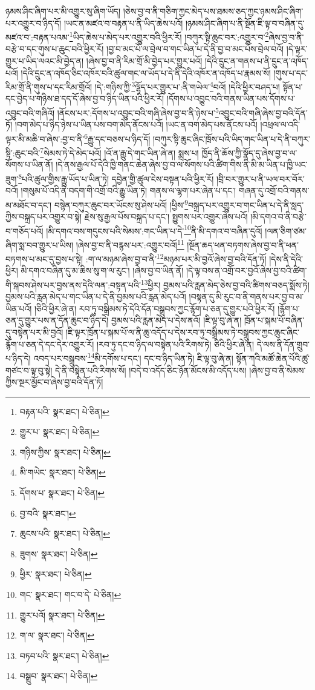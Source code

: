 ཉམས་ཤིང་ཞིག་པར་མི་འགྱུར་སུ་ཞིག་ཡོད། །ཅེས་བྱ་བ་ནི་གཅིག་ཀྱང་མེད་པས་ཐམས་ཅད་ཀྱང་ཉམས་ཤིང་ཞིག་པར་འགྱུར་བ་ཉིད་དོ། །ཡང་ན་མཛའ་བ་བརྟན་པ་ནི་ཡིད་ཆེས་པའོ། །ཉམས་ཤིང་ཞིག་པ་ནི་སྔོན་ཇི་ལྟ་བ་བཞིན་དུ་མཛའ་བ་:བརྟན་པའམ་\footnote{བརྟན་པའི་  སྣར་ཐང་།  པེ་ཅིན། }ཡིད་ཆེས་པ་མེད་པར་འགྱུར་བའི་ཕྱིར་རོ། །བཀུར་སྟི་ཆུང་བར་:འགྱུར་བ་\footnote{གྱུར་པ་  སྣར་ཐང་།  པེ་ཅིན། }ཞེས་བྱ་བ་ནི་བརྩེ་བ་དང་གུས་པ་ཆུང་བའི་ཕྱིར་རོ། །བྱ་བ་མང་པོ་ལ་བྲེལ་བ་གང་ཡིན་པ་དེ་ནི་བྱ་བ་མང་པོས་བྲེལ་བའོ། །དེ་ལྟར་གྱུར་པ་ཡིད་ལའང་མི་བྱེད་ན། །ཞེས་བྱ་བ་ནི་རིམ་གྲོ་མི་བྱེད་པར་གྱུར་པའོ། །དེའི་དྲུང་ན་གནས་པ་ནི་དྲུང་ན་འཁོད་པའོ། །དེའི་དྲུང་ན་འཁོད་ཅིང་འཁོར་བའི་ཚུལ་གང་ལ་ཡོད་པ་དེ་ནི་དེའི་འཁོར་ན་འཁོད་པ་རྣམས་སོ། །གུས་པ་དང་རིམ་གྲོ་ནི་གུས་པ་དང་རིམ་གྲོའོ། །དེ་:གཉིས་ཀྱི་\footnote{གཉིས་ཀྱིས་  སྣར་ཐང་།  པེ་ཅིན། }ལྷོད་པར་གྱུར་པ་:ནི་གཡེལ་\footnote{མི་གཡེང་  སྣར་ཐང་།  པེ་ཅིན། }བའོ། །དེའི་ཕྱིར་བཤད་པ། སྟོན་པ་དང་བྱེད་པ་གཉིས་ཐ་དད་དོ་ཞེས་བྱ་བ་ཉིད་ཡིན་པའི་ཕྱིར་རོ། །དོགས་པ་འབྱུང་བའི་གནས་ཡིན་པས་དོགས་པ་འབྱུང་བའི་གཞིའོ། །ནོངས་པར་:དོགས་པ་འབྱུང་བའི་གཞི་ཞེས་བྱ་བ་ནི་ཉེས་པ་\footnote{དོགས་པ་  སྣར་ཐང་།  པེ་ཅིན། }འབྱུང་བའི་གཞི་ཞེས་བྱ་བའི་དོན་ཏོ། །བག་མེད་པ་ཉིད་ཉེས་པ་ཡིན་པས་བག་མེད་ནོངས་པའོ། །ཡང་ན་བག་མེད་པས་ནོངས་པའོ། །འཕྲལ་ལ་འདི་ལྟར་མི་མཆི་བ་ཞེས་:བྱ་བ་ནི་\footnote{བྱ་བའི་  སྣར་ཐང་། }རྒྱུ་དང་བཅས་པ་ཉིད་དོ། །བཀུར་སྟི་ཆུང་ཞིང་ཁྲོས་པའི་ཡིད་གང་ཡིན་པ་དེ་ནི་བཀུར་སྟི་:ཆུང་བའི་\footnote{ཆུངས་པའི་  སྣར་ཐང་།  པེ་ཅིན། }སེམས་ཏེ་དེ་མེད་པའོ། །འོ་ན་རྒྱུ་དེ་གང་ཡིན་ཞེ་ན། སྨྲས་པ། ཁྱོད་ནི་ཆོས་ཀྱི་སྣོད་དུ་ཞེས་བྱ་བ་ལ་སོགས་པ་ཡིན་ནོ། །དེ་ནས་རྒྱལ་པོ་དེའི་ཁྱི་གནང་ཆེན་ཞེས་བྱ་བ་ལ་སོགས་པའི་ཚིག་གིས་ནི་མི་མ་ཡིན་པ་ཁྱི་ཡང་ཟུག་\footnote{ཟུགས་  སྣར་ཐང་།  པེ་ཅིན། }པའི་ཚུལ་གྱིས་རྒྱུ་ཡོད་པ་ཡིན་ཏེ། དབྱེན་གྱི་ཚུལ་ངེས་བསྟན་པའི་ཕྱིར་རོ། །བྲི་བར་གྱུར་པ་ནི་ཡལ་བར་བོར་བའོ། །གསུམ་པོ་འདི་ནི་བདག་གི་འགྲོ་བའི་རྒྱུ་ཡིན་ཏེ། གནས་ལ་ལྷག་པར་ཞེན་པ་དང་། གཞན་དུ་འགྲོ་བའི་གནས་མ་མཐོང་བ་དང་། བསྙེན་བཀུར་ཆུང་བར་ཡོངས་སུ་ཤེས་པའོ། །ཕྱིས་\footnote{ཕྱིར་  སྣར་ཐང་།  པེ་ཅིན། }བསྐྲད་པར་འགྱུར་བ་གང་ཡིན་པ་དེ་ནི་སླད་ཀྱིས་བསྐྲད་པར་འགྱུར་བ་སྟེ། རྗེས་སུ་རྒྱལ་པོས་བསྐྲད་པ་དང་། སྤྱུགས་པར་འགྱུར་ཞེས་པའོ། །མི་དགའ་བ་ནི་བརྩེ་བ་གཅོད་པའོ། །མི་དགའ་བས་གདུངས་པའི་སེམས་:གང་ཡིན་པ་དེ་\footnote{གང་  སྣར་ཐང་། གང་བ་དེ་  པེ་ཅིན། }ནི་མི་དགའ་བ་བཞིན་དུའོ། །ལན་ཅིག་ཙམ་ཞིག་སྨ་བབ་གྱུར་པ་ཡིས། །ཞེས་བྱ་བ་ནི་བརྙས་པར་:འགྱུར་བའོ།\footnote{གྱུར་པའོ།  སྣར་ཐང་།  པེ་ཅིན། } །སྔོན་ཆད་ཕན་བཏགས་ཞེས་བྱ་བ་ནི་ཕན་བཏགས་པ་མང་དུ་བྱས་པ་སྟེ། :ག་ལ་མཉམ་ཞེས་བྱ་བ་ནི་\footnote{ག་ལ་  སྣར་ཐང་།  པེ་ཅིན། }མཉམ་པར་མི་བྱའོ་ཞེས་བྱ་བའི་དོན་ཏོ། །དེས་ནི་དེའི་ཕྱིར། མི་དགའ་བཞིན་དུ་མ་ཆིས་སུ་ག་ལ་རུང་། །ཞེས་བྱ་བ་ཡིན་ནོ། །དེ་ལྟ་བས་ན་འགྲོ་བར་བྱའོ་ཞེས་བྱ་བའི་ཚིག་གི་སྐབས་ཤེས་པར་བྱས་ནས་དེའི་ལན་:བསྟན་པའི་\footnote{བཏབ་པའི་  སྣར་ཐང་།  པེ་ཅིན། }ཕྱིར། བྱམས་པའི་རླན་མེད་ཅེས་བྱ་བའི་ཚིགས་བཅད་སྨོས་ཏེ། བྱམས་པའི་རླན་མེད་པ་གང་ཡིན་པ་དེ་ནི་བྱམས་པའི་རླན་མེད་པའོ། །བསྟན་དུ་མི་རུང་བ་ནི་གནས་པར་བྱ་བ་མ་ཡིན་པའོ། །ཅིའི་ཕྱིར་ཞེ་ན། རབ་ཏུ་བསྒྲིམས་ཏེ་དེའི་དོན་བསྒྲུབས་ཀྱང་རྙོག་པ་ཅན་དུ་གྱུར་པའི་ཕྱིར་རོ། །རྙོག་པ་ཅན་དུ་གྱུར་པས་ན་དོན་ཆུང་བ་ཉིད་དེ། བྱམས་པའི་རླན་མེད་པ་དེས་ནའོ། །ཇི་ལྟ་བུ་ཞེ་ན། ཁྲོན་པ་སྐམ་པོ་བཞིན་དུ་བསྟེན་པར་མི་བྱའོ། །ཇི་ལྟར་ཁྲོན་པ་སྐམ་པོ་ལ་ནི་ཆུ་འདོད་པ་དེས་རབ་ཏུ་བསྒྲིམས་ཏེ་བསྒྲུབས་ཀྱང་ཆུང་ཞིང་རྙོག་པ་ཅན་དེ་དང་དེར་འགྱུར་རོ། །རབ་ཏུ་དང་བ་ཉིད་ལ་བསྟེན་པའི་རིགས་ཏེ། ཅིའི་ཕྱིར་ཞེ་ན། དེ་ལས་ནི་དོན་གྲུབ་པ་ཉིད་དེ། འབད་པར་བསྒྲུབས་\footnote{བསྒྲུབ་  སྣར་ཐང་།  པེ་ཅིན། }མི་དགོས་པ་དང་། དང་བ་ཉིད་ཡིན་ཏེ། ཇི་ལྟ་བུ་ཞེ་ན། སྟོན་ཀའི་མཚོ་ཆེན་པོའི་ཚུ་གཙང་བ་ལྟ་བུ་སྟེ། དེ་ནི་བསྟེན་པའི་རིགས་སོ། །བདེ་བ་འདོད་ཅིང་ཉོན་མོངས་མི་འདོད་པས། །ཞེས་བྱ་བ་ནི་སེམས་ཀྱིས་སྔར་མྱོང་བ་ཞེས་བྱ་བའི་དོན་ཏོ། 